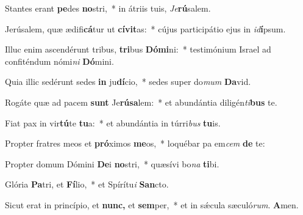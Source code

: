 \item Stantes erant \textbf{pe}des \textbf{no}stri,~* in átriis tuis, \thinspace\textit{Je}\textbf{rú}salem.
\item Jerúsalem, quæ ædifi\textbf{cá}tur ut \textbf{cívit}as:~* cújus participátio ejus in \textit{id}\textbf{í}psum.
\item Illuc enim ascendérunt tribus, \textbf{tri}bus \textbf{Dómi}ni:~* testimónium Israel ad confiténdum nómi\textit{ni} \textbf{Dó}mini.
\item Quia illic sedérunt sedes \textbf{in} ju\textbf{dí}cio,~* sedes super do\textit{mum} \textbf{Da}vid.
\item Rogáte quæ ad pacem \textbf{sunt} Je\textbf{rúsa}lem:~* et abundántia diligén\textit{ti}\textbf{bus} te.
\item Fiat pax in vir\textbf{tú}te \textbf{tu}a:~* et abundántia in túrri\textit{bus} \textbf{tu}is.
\item Propter fratres meos et \textbf{pró}ximos \textbf{me}os,~* loquébar pa em\textit{cem} \textbf{de} te:
\item Propter domum Dómini \textbf{De}i \textbf{no}stri,~* quæsívi bo\textit{na} \textbf{ti}bi.
\item Glória \textbf{Pa}tri, et \textbf{Fí}lio,~* et Spírítu\textit{i} \textbf{San}cto.
\item Sicut erat in princípio, et \textbf{nunc,} et \textbf{sem}per,~* et in sǽcula sæculó\textit{rum}. \textbf{A}men.